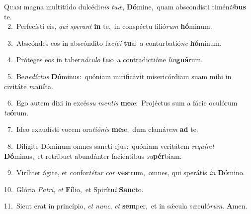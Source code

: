 \lettrine{\initial\textcolor{\initialcolor}{Q}}{uam} magna multitúdo dulcédi\textit{nis} \textit{tu}\-\textit{æ}, \textbf{Dó}\-mine,~\star quam abscondísti timén\-\textit{ti}\-\textbf{bus} te.\\
{\numbfont\textcolor{\numbcolor}{~2.}}~Perfecísti eis, \textit{qui} \textit{spe}\-\textit{rant} \textbf{in} te,~\star in conspéctu filió\textit{rum} \textbf{hó}\-minum.\par
{\numbfont\textcolor{\numbcolor}{~3.}}~Abscóndes eos in abscóndito fa\-\textit{ci}\-\textit{é}\textit{i} \textbf{tu}\-æ~\star a conturbatió\textit{ne} \textbf{hó}\-minum.\par
{\numbfont\textcolor{\numbcolor}{~4.}}~Próteges eos in taber\-\textit{ná}\-\textit{cu}\textit{lo} \textbf{tu}\-o~\star a contradictióne \textit{lin}\-\textbf{guá}rum.\par
{\numbfont\textcolor{\numbcolor}{~5.}}~Be\-\textit{ne}\-\textit{díc}\textit{tus} \textbf{Dó}\-minus:~\star quóniam mirificávit misericórdiam suam mihi in civitáte \textit{mu}\-\textbf{ní}ta.\par
{\numbfont\textcolor{\numbcolor}{~6.}}~Ego autem dixi in excés\textit{su} \textit{men}\-\textit{tis} \textbf{me}\-æ:~\star Projéctus sum a fácie oculórum \textit{tu}\-\textbf{ó}rum.\par
{\numbfont\textcolor{\numbcolor}{~7.}}~Ideo exaudísti vocem ora\-\textit{ti}\-\textit{ó}\textit{nis} \textbf{me}\-æ,~\star dum clamá\textit{rem} \textbf{ad} te.\par
{\numbfont\textcolor{\numbcolor}{~8.}}~Dilígite Dóminum omnes sancti ejus:~\dagger quóniam veritátem \textit{re}\-\textit{quí}\textit{ret} \textbf{Dó}\-minus,~\star et retríbuet abundánter faciéntibus \textit{su}\-\textbf{pér}biam.\par
{\numbfont\textcolor{\numbcolor}{~9.}}~Viríliter ágite, et confor\-\textit{té}\-\textit{tur} \textit{cor} \textbf{ves}\-trum,~\star omnes, qui sperátis \textit{in} \textbf{Dó}\-mino.\par
{\numbfont\textcolor{\numbcolor}{10.}}~Glória \textit{Pa}\-\textit{tri}, \textit{et} \textbf{Fí}\-lio,~\star et Spirítu\textit{i} \textbf{Sanc}\-to.\par
{\numbfont\textcolor{\numbcolor}{11.}}~Sicut erat in princípio, \textit{et} \textit{nunc}\-, \textit{et} \textbf{sem}\-per,~\star et in sǽcula sæculó\-\textit{rum}\-. \textbf{A}\-men.\par
